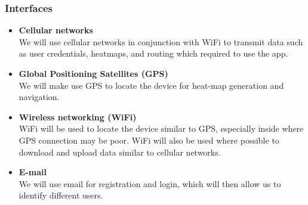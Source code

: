 \documentclass[english]{article}
\begin{document}
						\subsubsection{Interfaces}
    						\begin{itemize}
    						    \item \textbf{Cellular networks} \\
    						    We will use cellular networks in conjunction with WiFi to transmit data such as user credentials, heatmaps, and routing which required to use the app. \\
    						    
    						    \item \textbf{Global Positioning Satellites (GPS)} \\
    						    We will make use GPS to locate the device for heat-map generation and navigation.    						    
    						    \item \textbf{Wireless networking (WiFi)} \\
	    						    WiFi will be used to locate the device similar to GPS, especially inside where GPS connection may be poor. WiFi will also be used where possible to download and upload data similar to cellular networks. 
    						    \item \textbf{E-mail} \\
    						    We will use email for registration and login, which will then allow us to identify different users.  \\
    						\end{itemize}
    						
\end{document}
